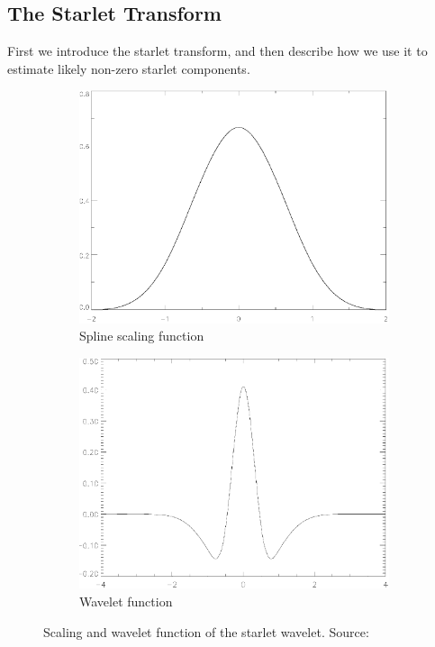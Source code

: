 \subsection{The Starlet Transform} \label{cd:starlets}
First we introduce the starlet transform, and then describe how we use it to estimate likely non-zero starlet components.

\begin{figure}[h]
	\centering
	\begin{subfigure}[b]{0.4\linewidth}
		\includegraphics[width=\linewidth]{./chapters/05.algorithms/starlets/scaling.png}
		\caption{Spline scaling function}
		\label{cd:starlets:scaling}
	\end{subfigure}
	\begin{subfigure}[b]{0.4\linewidth}
		\includegraphics[width=\linewidth]{./chapters/05.algorithms/starlets/wavelet.png}
		\caption{Wavelet function}
		\label{cd:starlets:wavelet}
	\end{subfigure}
	\caption{Scaling and wavelet function of the starlet wavelet. Source: \cite{starck2015starlet}}
	\label{cd:starlets:figure}
\end{figure}

